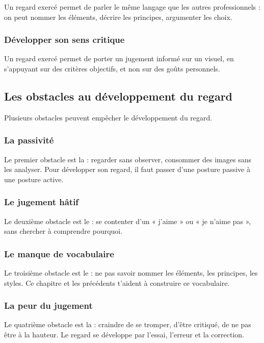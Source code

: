 Un regard exercé permet de parler le même langage que les autres professionnels : on peut nommer les éléments, décrire les principes, argumenter les choix.

\subsubsection{Développer son sens critique}

Un regard exercé permet de porter un jugement informé sur un visuel, en s'appuyant sur des critères objectifs, et non sur des goûts personnels.

\subsection{Les obstacles au développement du regard}

Plusieurs obstacles peuvent empêcher le développement du regard.

\subsubsection{La passivité}

Le premier obstacle est la  : regarder sans observer, consommer des images sans les analyser. Pour développer son regard, il faut passer d'une posture passive à une posture active.

\subsubsection{Le jugement hâtif}

Le deuxième obstacle est le  : se contenter d'un « j'aime » ou « je n'aime pas », sans chercher à comprendre pourquoi.

\subsubsection{Le manque de vocabulaire}

Le troisième obstacle est le  : ne pas savoir nommer les éléments, les principes, les styles. Ce chapitre et les précédents t'aident à construire ce vocabulaire.

\subsubsection{La peur du jugement}

Le quatrième obstacle est la  : craindre de se tromper, d'être critiqué, de ne pas être à la hauteur. Le regard se développe par l'essai, l'erreur et la correction.

